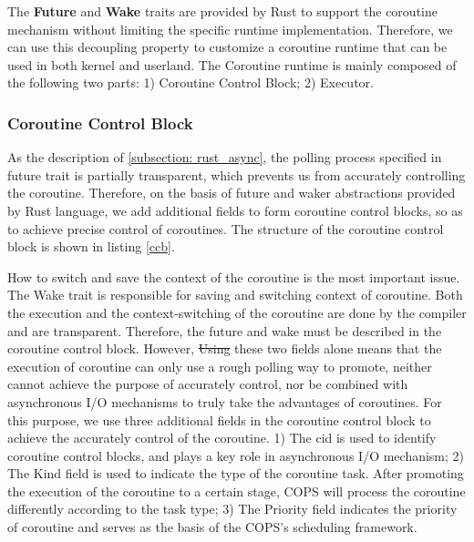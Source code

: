 \documentclass[sigconf,review,anonymous]{acmart}
\providecommand{\DIFadd}[1]{{\protect\color{blue}\uwave{#1}}} %
\providecommand{\DIFdel}[1]{{\protect\color{red}\sout{#1}}}                      %
\providecommand{\DIFaddbegin}{} %
\providecommand{\DIFaddend}{} %
\providecommand{\DIFdelbegin}{} %
\providecommand{\DIFdelend}{} %
\begin{document}
The \textbf{Future} and \textbf{Wake} traits are provided by Rust to support the coroutine mechanism without limiting the specific runtime implementation. Therefore, we can use this decoupling property to customize a coroutine runtime that can be used in both kernel and userland. The Coroutine runtime is mainly composed of the following two parts: 1) Coroutine Control Block; 2) Executor.

\subsubsection{Coroutine Control Block}

As the description of \ref{subsection: rust_async}, the polling process specified in future trait is partially transparent, which prevents us from accurately controlling the coroutine. Therefore, on the basis of future and waker abstractions provided by Rust language, we add additional fields to form coroutine control blocks, so as to achieve precise control of coroutines. The structure of the coroutine control block is shown in listing \ref{ccb}.

How to switch and save the context of the coroutine is the most important issue. The Wake trait is responsible for saving and switching context of coroutine. Both the execution and the context-switching of the coroutine are done by the compiler and are transparent. Therefore, the future and wake must be described in the coroutine control block. However, \DIFdelbegin \DIFdel{Using }\DIFdelend \DIFaddbegin \DIFadd{using }\DIFaddend these two fields alone means that the execution of coroutine can only use a rough polling way to promote, neither cannot achieve the purpose of accurately control, nor be combined with asynchronous I/O mechanisms to truly take the advantages of coroutines. For this purpose, we use three additional fields in the coroutine control block to achieve the accurately control of the coroutine. 1) The cid is used to identify coroutine control blocks, and plays a key role in asynchronous I/O mechanism; 2) The Kind field is used to indicate the type of the coroutine task. After promoting the execution of the coroutine to a certain stage, COPS will process the coroutine differently according to the task type; 3) The Priority field indicates the priority of coroutine and serves as the basis of the COPS's scheduling framework.
\end{document}
